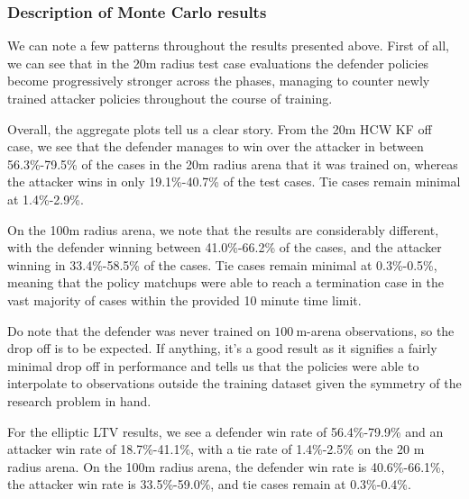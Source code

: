 \clearpage




\subsubsection{Description of Monte Carlo results}
\label{sec:mc_results_description}



We can note a few patterns throughout the results presented above. First of all, we can see that in the 20m radius test case evaluations the defender policies become progressively stronger across the phases, managing to counter newly trained attacker policies throughout the course of training.

Overall, the aggregate plots tell us a clear story. From the 20m HCW KF off case, we see that the defender manages to win over the attacker in between 56.3\%-79.5\% of the cases in the 20m radius arena that it was trained on, whereas the attacker wins in only 19.1\%-40.7\% of the test cases. Tie cases remain minimal at 1.4\%-2.9\%.

On the 100m radius arena, we note that the results are considerably different, with the defender winning between 41.0\%-66.2\% of the cases, and the attacker winning in 33.4\%-58.5\% of the cases. Tie cases remain minimal at 0.3\%-0.5\%, meaning that the policy matchups were able to reach a termination case in the vast majority of cases within the provided 10 minute time limit.


Do note that the defender was never trained on $100~\mathrm{m}$-arena observations, so the drop off is to be expected. If anything, it's a good result as it signifies a fairly minimal drop off in performance and tells us that the policies were able to interpolate to observations outside the training dataset given the symmetry of the research problem in hand.

For the elliptic LTV results, we see a defender win rate of 56.4\%-79.9\% and an attacker win rate of 18.7\%-41.1\%, with a tie rate of 1.4\%-2.5\% on the 20 m radius arena. On the 100m radius arena, the defender win rate is 40.6\%-66.1\%, the attacker win rate is 33.5\%-59.0\%, and tie cases remain at 0.3\%-0.4\%.


